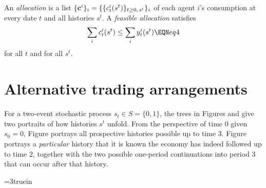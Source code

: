 
\medskip
{}   An {\it allocation} is
a list $\{{\bf c}^i\}_i=\{\{c_t^i(s^t)\}_{t\geq0,\,s^t}\}_i$ of each agent $i$'s consumption at every date $t$ and 
all histories $s^t$. A {\it feasible allocation} satisfies
$$\sum_i c_t^i(s^t) \leq \sum_i y_t^i(s^t)  \EQN eq4 $$
for all $t$ and for all $s^t$.


\section{Alternative trading arrangements}
For a two-event stochastic process $s_t \in S = \{0, 1\}$, the
trees in Figures  and  %
 give
two portraits of how histories $s^t$ unfold.  From the
perspective of time $0$ given $s_0=0$, Figure  portrays
all prospective histories possible up to time
$3$. Figure  portrays  a {\it particular\/} history that it is
known the economy has indeed followed up to   time $2$, together
with the  two possible one-period continuations into period $3$
that can occur after that history.


\centerline{\epsfxsize=3truein} \caption{The
Arrow-Debreu commodity space for a two-state Markov chain. At time
$0$, there are trades in time $t=3$ goods for each of the eight
nodes that signify histories that can possibly be reached starting from
the node at time $0$.} 
\endfigure



